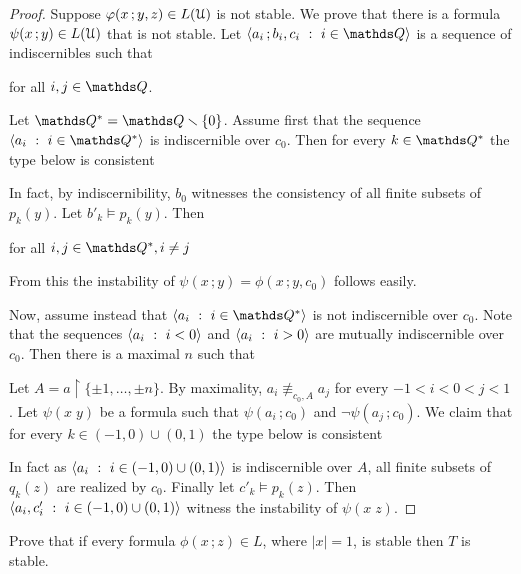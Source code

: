 \begin{proof}
  Suppose $\varphi(x\,;y,z)\in L(\EuScript U)$ is not stable.
  We prove that there is a formula $\psi(x\,;y)\in L(\EuScript U)$ that is not stable.
  Let $\<a_i\,;b_i,c_i\ :\ i\in\QQ\>$ is a sequence of indiscernibles such that 

  \hfill for all $i,j\in\QQ$.

  Let $\QQ^*=\QQ\sm\{0\}$.
  Assume first that the sequence $\<a_i\ :\ i\in\QQ^*\>$ is indiscernible over $c_0$.
  Then for every $k\in\QQ^*$ the type below is consistent


  In fact, by indiscernibility, $b_0$ witnesses the consistency of all finite subsets of $p_k(y)$.
  Let $b'_k\models p_k(y)$.
  Then

  \hfill for all $i,j\in\QQ^*, i\neq j$

  From this the instability of $\psi(x\,;y)=\phi(x\,;y,c_0)$ follows easily.

  Now, assume instead that $\<a_i\ :\ i\in\QQ^*\>$ is not indiscernible over $c_0$.
  Note that the sequences $\<a_i\ :\ i<0\>$ and $\<a_i\ :\ i>0\>$ are mutually indiscernible over $c_0$.
  Then there is a maximal $n$ such that


  Let $A=a\restriction\{\pm1,\dots,\pm n\}$.
  By maximality, $a_i\nequiv_{c_0,A}a_j$ for every $-1<i<0<j<1$.
  Let $\psi(x\;y)$ be a formula such that $\psi(a_i\,;c_0)$ and $\neg\psi(a_j\,;c_0)$.
  We claim that for every $k\in(-1,0)\cup(0,1)$ the type below is consistent


  In fact as $\<a_i\ :\ i\in(-1,0)\cup(0,1)\>$ is indiscernible over $A$, all finite subsets of $q_k(z)$ are realized by $c_0$.
  Finally let $c'_k\models p_k(z)$.
  Then $\<a_i,c'_i\ :\ i\in(-1,0)\cup(0,1)\>$ witness the instability of $\psi(x\;z)$.
\end{proof}

\begin{exercise}
  Prove that if every formula $\phi(x\,;z)\in L$, where $|x|=1$, is stable then $T$ is stable.
\end{exercise}


